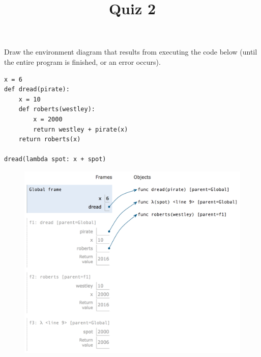 \documentclass[twoside]{article}
\title{\sc Quiz 2 \solution{Solutions}}
\begin{document}
\maketitle

\begin{enumerate}

Draw the environment diagram that results from executing the code below (until the entire program is finished, or an error occurs).
\vspace{0.1in}

\begin{lstlisting}
x = 6
def dread(pirate):
    x = 10
    def roberts(westley):
        x = 2000
        return westley + pirate(x)
    return roberts(x)

dread(lambda spot: x + spot)
\end{lstlisting}

\begin{figure}[ht!]
\hspace*{5mm}
\includegraphics[width=155mm]{../../../../images/quiz2_sol.png}
\end{figure}

\end{enumerate}
\end{document}
